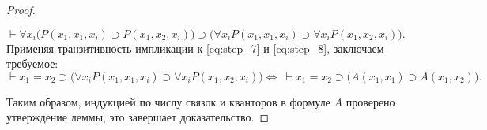 \begin{proof}
\begin{enumerate}
        \begin{equation}\label{eq:step_8}
            \vdash \forall x_i\big(P(x_1, x_1, x_i) \supset P(x_1, x_2, x_i)\big) \supset \big(\forall x_iP(x_1, x_1, x_i) \supset \forall x_iP(x_1, x_2, x_i)\big).
        \end{equation}
        Применяя транзитивность импликации к \eqref{eq:step_7} и \eqref{eq:step_8}, заключаем требуемое:
        \[
            \vdash x_1 = x_2 \supset \big(\forall x_iP(x_1, x_1, x_i) \supset \forall x_iP(x_1, x_2, x_i)\big) \Longleftrightarrow\ \vdash x_1 = x_2 \supset \big(A(x_1, x_1) \supset A(x_1, x_2)\big).
        \]
    \end{enumerate}
    Таким образом, индукцией по числу связок и кванторов в формуле $A$ проверено утверждение леммы, это завершает доказательство.
\end{proof}
